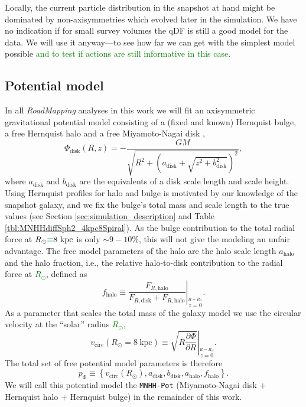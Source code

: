 \documentclass[iop,revtex4,numberedappendix,appendixfloats]{emulateapj}
\newcommand{\RM}{{\sl RoadMapping}}
\newcommand{\NEW}[1]{\textcolor{Green}{#1}}
\newcommand{\OLD}[1]{}
\begin{document}
Locally, the current particle distribution in the snapshot at hand might be dominated by non-axisymmetries which evolved later in the simulation. We have no indication if for small survey volumes the qDF is still a good model for the data. We will use it anyway---to see how far we can get with the simplest model possible \NEW{and to test if actions are still informative in this case}.

\subsection{Potential model} \label{sec:potential_model}

In all \RM{} analyses in this work we will fit an axisymmetric gravitational potential model \OLD{to the data }consisting of a (fixed and known) Hernquist bulge, a free Hernquist halo and a free Miyamoto-Nagai disk \citep{1975PASJ...27..533M},
\begin{equation}
\Phi_\text{disk}(R,z) = - \frac{GM}{\sqrt{R^2+(a_\text{disk}+\sqrt{z^2+b_\text{disk}^2})^2}}, \label{eq:MN-disk}
\end{equation}
where $a_\text{disk}$ and $b_\text{disk}$ are the equivalents of a disk scale length and scale height. Using Hernquist profiles for halo and bulge is motivated by our knowledge of the snapshot galaxy, and we fix the bulge's total mass and scale length to the true values (see Section \ref{sec:simulation_description} and Table \ref{tbl:MNHHdiffSph2_4kpc8Spiral}). As the bulge contribution to the total radial force at $R_\odot\OLD{=}\NEW{\equiv}8~\text{kpc}$ is only $\sim9-10\%$, this will not give the modeling an unfair advantage. The free model parameters of the halo are the halo scale length $a_\text{halo}$ and the halo fraction, i.e., the relative halo-to-disk contribution to the radial force at \OLD{the solar radius}\NEW{$R_\odot$}, defined as
\begin{equation}
f_\text{halo} \equiv \left. \frac{F_{R,\text{halo}}}{F_{R,\text{disk}} + F_{R,\text{halo}}} \right|_{\stackrel{R=R_\odot}{z=0}}.\label{eq:fhalo}
\end{equation}
As a parameter that scales the total mass of the galaxy model we use the circular velocity at the ``solar'' radius \NEW{$R_\odot$},
\begin{equation}
v_\text{circ}(R_\odot=8~\text{kpc}) \equiv \left. \sqrt{ R \frac{\partial \Phi}{\partial R} }\right|_{\stackrel{R=R_\odot}{z=0}} . \label{eq:circvel}
\end{equation}  
The total set of free potential model parameters is therefore
\begin{equation}
p_\Phi \equiv \left\{ v_\text{circ}(R_\odot),a_\text{disk},b_\text{disk},a_\text{halo},f_\text{halo}\right\}.
\end{equation} 
We will call this potential model the \texttt{MNHH-Pot} (Miyamoto-Nagai disk + Hernquist halo + Hernquist bulge) in the remainder of this work.
\end{document}
